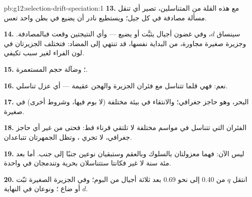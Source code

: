 \begin{solution}{pb:g12:selection-drift-speciation:1}
\textbf{13.} مع هذه القلة من المتناسلين، تصير أي  تنقل مسألة
مصادفة في كل جيل؛ ويستطيع  نادر أن يضيع في بطن واحد تعس.

\textbf{14.} سينساق $d$، وفي غضون أجيال يثبَّت أو يضيع --- وأي
النتيجتين وقعت فبالمصادفة. وجزيرة صغيرة مجاورة، من البداية نفسها، قد
تنتهي إلى  المضاد: فتختلف الجزيرتان في لون الفراء لغير سبب تكيفي.

\textbf{15.} ؛ وضآلة حجم المستعمرة.

\textbf{16.} نعم: فهي قلما تتناسل مع فئران الجزيرة والهجن عقيمة ---
أي عزل تناسلي.

\textbf{17.} البحر، وهو حاجز جغرافي؛ والانتقاء في بيئة مختلفة (لا بوم
فيها، وشروط أخرى)  في  صغيرة.

\textbf{18.} الفئران التي تتناسل في مواسم مختلفة لا تلتقي قرناء قط:
فحتى من غير أي حاجز جغرافي، لا تجري ، وتظل الجمهرتان تتباعدان.

\textbf{19.} ليس الآن: فهما معزولتان بالسلوك وبالعقم وستبقيان نوعين
جنبًا إلى جنب. أما بعد مئة سنة لا غير فكانتا ستتناسلان بحرية وتندمجان
في  واحدة.

\textbf{20.} انتقل $q$ من 0.40 إلى نحو 0.69 بعد ثلاثة أجيال من البوم؛
وفي الجزيرة الصغيرة ثبّت $d$ أو ضاع ؛ ونوعان في
النهاية.
\end{solution}
